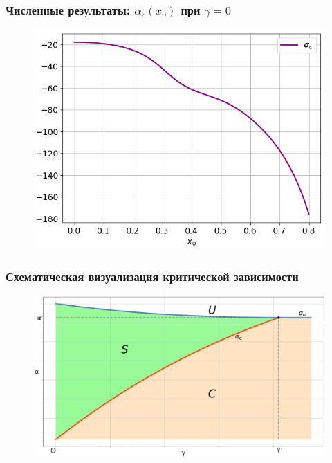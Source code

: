 \documentclass[fullscreen=true, unicode, bookmarks=false]{beamer}
\begin{document}
\begin{frame}
\frametitle{ Численные результаты: $ \alpha_c(x_0) $ при $ \gamma = 0 $ }

\begin{figure} 
\includegraphics[scale=0.65]{origins.png}  
\end{figure}

\end{frame}


\begin{frame}
\frametitle{ Схематическая визуализация критической зависимости }

\begin{figure} 
\includegraphics[scale=0.35]{scheme.png}  
\end{figure}

\end{frame}
\end{document}
